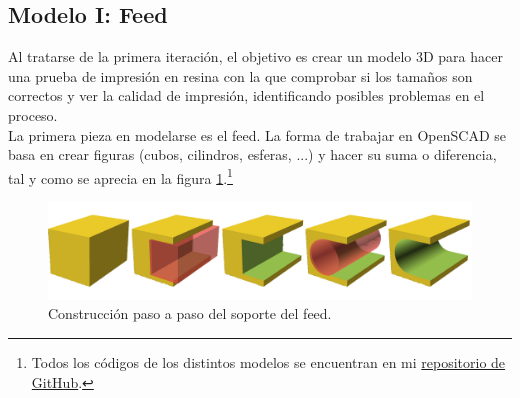 \documentclass[11pt,a4paper,twoside,pdf]{article}
\numberwithin{equation}{section}
\begin{document}
\subsection{Modelo I: Feed}

Al tratarse de la primera iteración, el objetivo es crear un modelo 3D para hacer una prueba de impresión en resina con la que comprobar si los tamaños son correctos y ver la calidad de impresión, identificando posibles problemas en el proceso.\\

La primera pieza en modelarse es el feed. La forma de trabajar en OpenSCAD se basa en crear figuras (cubos, cilindros, esferas, ...) y hacer su suma o diferencia, tal y como se aprecia en la figura \ref{fig:construcFeed}.\footnote{Todos los códigos de los distintos modelos se encuentran en mi \href{https://github.com/Alex-ZM/TEM_Horn_Antenna}{repositorio de GitHub}.}
\begin{figure}[!h]
    \centering
    \includegraphics[width=\linewidth]{img/modelos/SoporteFeed/collageFeed.png}
    \vspace{-0.5cm}
    \caption{Construcción paso a paso del soporte del feed.}
    \label{fig:construcFeed}
\end{figure}
\end{document}
